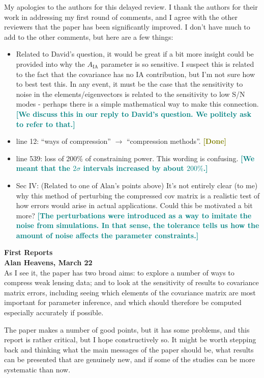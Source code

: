 \documentclass{article}
\newcommand\reply[1]{{\bf {\textcolor{teal}{[#1]}}}}
\newcommand\done{{\bf {\textcolor{olive}{[Done]}}}}
\begin{document}
    My apologies to the authors for this delayed review. I thank the authors for their work in addressing my first round of comments, and I agree with the other reviewers that the paper has been significantly improved. I don't have much to add to the other comments, but here are a few things: 
    \begin{itemize}
        \item Related to David's question, it would be great if a bit more insight could be provided into why the $A_{\mathrm{IA}}$ parameter is so sensitive. I suspect this is related to the fact that the covariance has no IA contribution, but I'm not sure how to best test this. In any event, it must be the case that the sensitivity to noise in the elements/eigenvectors is related to the sensitivity to low S/N modes - perhaps there is a simple mathematical way to make this connection. \reply{We discuss this in our reply to David's question. We politely ask to refer to that.}
        \item line 12: “ways of compression” $\rightarrow$ “compression methods”. \done
        \item line 539: loss of 200\% of constraining power. This wording is confusing. \reply{We meant that the $2 \sigma$ intervals increased by about $200\%$.}
        \item Sec IV: (Related to one of Alan's points above) It's not entirely clear (to me) why this method of perturbing the compressed cov matrix is a realistic test of how errors would arise in actual applications. Could this be motivated a bit more? \reply{The perturbations were introduced as a way to imitate the noise from simulations. In that sense, the tolerance tells us how the amount of noise affects the parameter constraints.}
    \end{itemize}

    
    \pagebreak

    {\Large\textbf{First Reports}}\\
	
	\textbf{Alan Heavens, March 22} \\
	
	As I see it, the paper has two broad aims: to explore a number of ways to compress weak lensing data; and to look at the sensitivity of results to covariance matrix errors, including seeing which elements of the covariance matrix are most important for parameter inference, and which should therefore be computed especially accurately if possible.
	
	The paper makes a number of good points, but it has some problems, and this report is rather critical, but I hope constructively so.  It might be worth stepping back and thinking what the main messages of the paper should be, what results can be presented that are genuinely new, and if some of the studies can be more systematic than now.  \\
	
\end{document}
